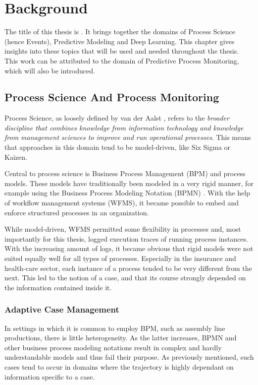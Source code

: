 \chapter{Background}\label{chap:background}
The title of this thesis is \textit{\thesisTitle}.
It brings together the domains of Process Science (hence Events), Predictive Modeling and Deep Learning.
This chapter gives insights into these topics that will be used and needed throughout the thesis.
This work can be attributed to the domain of Predictive Process Monitoring, which will also be introduced.

\section{Process Science And Process Monitoring}
Process Science, as loosely defined by van der Aalst \cite{Aalst2016}, refers to the \textit{broader discipline that combines knowledge from information technology and knowledge from management sciences to improve and run operational processes}. This means that approaches in this domain tend to be model-driven, like Six Sigma or Kaizen.

Central to process science is Business Process Management (BPM) and process models.
These models have traditionally been modeled in a very rigid manner, for example using the Business Process Modeling Notation (BPMN) \cite{bpmn2.0}.
With the help of workflow management systems (WFMS), it became possible to embed and enforce structured processes in an organization.

While model-driven, WFMS permitted some flexibility in processes and, most importantly for this thesis, logged execution traces of running process instances. With the increasing amount of logs, it became obvious that rigid models were not suited equally well for all types of processes. Especially in the insurance and health-care sector, each instance of a process tended to be very different from the next. This led to the notion of a case, and that its course strongly depended on the information contained inside it. 

\subsection{Adaptive Case Management}
In settings in which it is common to employ BPM, such as assembly line productions, there is little heterogeneity. As the latter increases, BPMN and other business process modeling notations result in complex and hardly understandable models and thus fail their purpose. As previously mentioned, such cases tend to occur in domains where the trajectory is highly dependant on information specific to a case.

